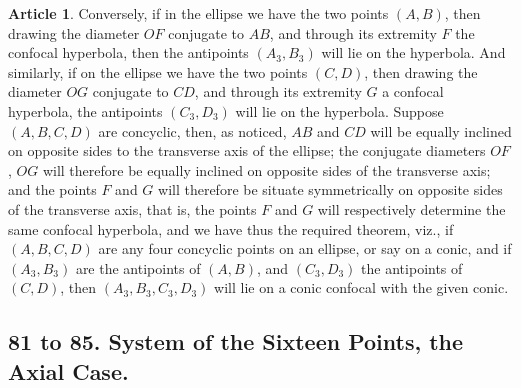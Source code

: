 \documentclass[11pt,a4paper]{article}
\theoremstyle{definition}
\newtheorem{art}{Article}
\begin{document}
\begin{art}
Conversely, if in the ellipse we have the two points $(A, B)$, then drawing the diameter $OF$ conjugate to $AB$, and through its extremity $F$ the confocal hyperbola, then the antipoints $(A_{3}, B_{3})$ will lie on the hyperbola. And similarly, if on the ellipse we have the two points $(C, D)$, then drawing the diameter $OG$ conjugate to $CD$, and through its extremity $G$ a confocal hyperbola, the antipoints $(C_{3}, D_{3})$ will lie on the hyperbola. Suppose $(A, B, C, D)$ are concyclic, then, as noticed, $AB$ and $CD$ will be equally inclined on opposite sides to the transverse axis of the ellipse; the conjugate diameters $OF$, $OG$ will therefore be equally inclined on opposite sides of the transverse axis; and the points $F$ and $G$ will therefore be situate symmetrically on opposite sides of the transverse axis, that is, the points $F$ and $G$ will respectively determine the same confocal hyperbola, and we have thus the required theorem, viz., if $(A, B, C, D)$ are any four concyclic points on an ellipse, or say on a conic, and if $(A_{3}, B_{3})$ are the antipoints of $(A, B)$, and $(C_{3}, D_{3})$ the antipoints of $(C, D)$, then $(A_{3}, B_{3}, C_{3}, D_{3})$ will lie on a conic confocal with the given conic.
\end{art}

\subsection*{81 to 85. System of the Sixteen Points, the Axial Case.}
\end{document}
